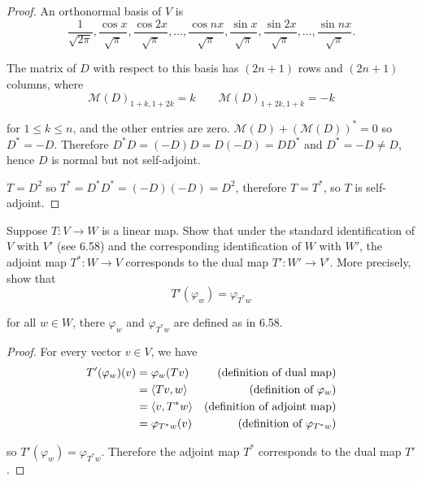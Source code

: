 \begin{proof}
    An orthonormal basis of $V$ is
    \[
        \frac{1}{\sqrt{2\pi}}, \frac{\cos x}{\sqrt{\pi}}, \frac{\cos 2x}{\sqrt{\pi}}, \ldots, \frac{\cos nx}{\sqrt{\pi}}, \frac{\sin x}{\sqrt{\pi}}, \frac{\sin 2x}{\sqrt{\pi}}, \ldots, \frac{\sin nx}{\sqrt{\pi}}.
    \]

    The matrix of $D$ with respect to this basis has $(2n+1)$ rows and $(2n+1)$ columns, where
    \[
        {\mathcal{M}(D)}_{1+k, 1+2k} = k\qquad {\mathcal{M}(D)}_{1+2k, 1+k} = -k
    \]

    for $1\leq k\leq n$, and the other entries are zero. $\mathcal{M}(D) + {(\mathcal{M}(D))}^{*} = 0$ so $D^{*} = -D$. Therefore $D^{*}D = (-D)D = D(-D) = DD^{*}$ and $D^{*} = -D\ne D$, hence $D$ is normal but not self-adjoint.

    $T = D^{2}$ so $T^{*} = D^{*}D^{*} = (-D)(-D) = D^{2}$, therefore $T = T^{*}$, so $T$ is self-adjoint.
\end{proof}
\newpage

\begin{exercise}
    Suppose $T: V \to W$ is a linear map. Show that under the standard identification of $V$ with $V'$ (see 6.58) and the corresponding identification of $W$ with $W'$, the adjoint map $T^{*}: W\to V$ corresponds to the dual map $T': W'\to V'$. More precisely, show that
    \[
        T'(\varphi_{w}) = \varphi_{T^{*}w}
    \]

    for all $w\in W$, there $\varphi_{w}$ and $\varphi_{T^{*}w}$ are defined as in 6.58.
\end{exercise}

\begin{proof}
    For every vector $v\in V$, we have
    \begin{align*}
        T'(\varphi_{w})(v) & = \varphi_{w}(Tv) & \text{(definition of dual map)} \\
                           & = \left\langle{Tv, w}\right\rangle & \text{(definition of $\varphi_{w}$)} \\
                           & = \left\langle{v, T^{*}w}\right\rangle & \text{(definition of adjoint map)} \\
                           & = \varphi_{T^{*}w}(v) & \text{(definition of $\varphi_{T^{*}w}$)}
    \end{align*}

    so $T'(\varphi_{w}) = \varphi_{T^{*}w}$. Therefore the adjoint map $T^{*}$ corresponds to the dual map $T'$.
\end{proof}
\newpage

